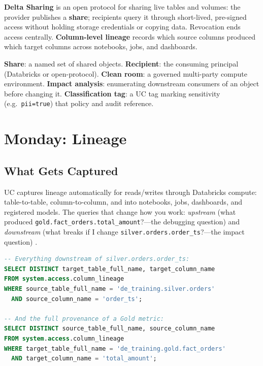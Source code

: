 \begin{definitionbox}
\textbf{Delta Sharing} is an open protocol for sharing live tables and volumes: the provider publishes a \textbf{share}; recipients query it through short-lived, pre-signed access without holding storage credentials or copying data. Revocation ends access centrally. \textbf{Column-level lineage} records which source columns produced which target columns across notebooks, jobs, and dashboards.
\end{definitionbox}

\begin{keyterms}
\textbf{Share}: a named set of shared objects. \textbf{Recipient}: the consuming principal (Databricks or open-protocol). \textbf{Clean room}: a governed multi-party compute environment. \textbf{Impact analysis}: enumerating downstream consumers of an object before changing it. \textbf{Classification tag}: a UC tag marking sensitivity (e.g.\ \texttt{pii=true}) that policy and audit reference.
\end{keyterms}

\section{Monday: Lineage}
\subsection{What Gets Captured}
UC captures lineage automatically for reads/writes through Databricks compute: table-to-table, column-to-column, and into notebooks, jobs, dashboards, and registered models. The queries that change how you work: \emph{upstream} (what produced \texttt{gold.fact\_orders.total\_amount}?---the debugging question) and \emph{downstream} (what breaks if I change \texttt{silver.orders.order\_ts}?---the impact question) \cite{databricksLineage}.

\begin{lstlisting}[language=SQL,caption={Column-level impact analysis before a breaking change.},label={lst:ch22-lineage}]
-- Everything downstream of silver.orders.order_ts:
SELECT DISTINCT target_table_full_name, target_column_name
FROM system.access.column_lineage
WHERE source_table_full_name = 'de_training.silver.orders'
  AND source_column_name = 'order_ts';

-- And the full provenance of a Gold metric:
SELECT DISTINCT source_table_full_name, source_column_name
FROM system.access.column_lineage
WHERE target_table_full_name = 'de_training.gold.fact_orders'
  AND target_column_name = 'total_amount';
\end{lstlisting}

